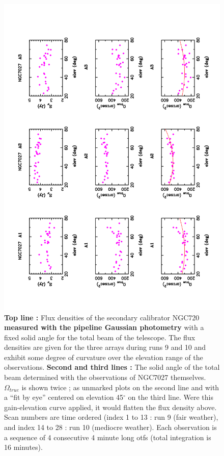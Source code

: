 \begin{figure}[p]
\begin{center}
  \includegraphics[clip, angle=-90, scale=0.6]{Figures/Flux_gain_curve_NGC7027}
  \caption{{\bf Top line :} Flux densities of the secondary calibrator NGC720 {\bf measured with the pipeline Gaussian photometry}
    with a fixed solid angle
    for the total beam of the telescope. The flux densities are given for the three arrays during runs 9 and 10  and  
    exhibit some degree of curvature over the elevation range of the observations.
    {\bf Second and third lines :} The solid angle of the total beam determined with the observations of NGC7027 themselves. $\Omega_{true}$
    is shown twice ; 
    as  unmarked plots on the second line and with  a ``fit by eye''  centered on  elevation 45$^{\circ}$ on the third line.
    Were this gain-elevation curve applied, it  would flatten the flux density above.  
    Scan numbers are time ordered (index 1 to 13 : run 9 (fair weather), and index 14 to 28 : run 10 (mediocre weather).
    Each observation is a sequence of 4 consecutive 4 minute long otfs (total integration is 16 minutes).
}

\label{fig:gain_curve_NG7027}
\end{center}
\end{figure}


















